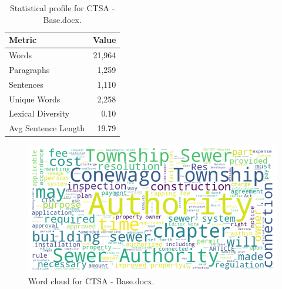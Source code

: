 \begin{table}[!ht]
\centering
\begin{tabular}{lr}
\toprule
\textbf{Metric} & \textbf{Value} \\
\midrule
Words & 21,964 \\
Paragraphs & 1,259 \\
Sentences & 1,110 \\
Unique Words & 2,258 \\
Lexical Diversity & 0.10 \\
Avg Sentence Length & 19.79 \\
\bottomrule
\end{tabular}
\caption{Statistical profile for CTSA - Base.docx.}
\label{tab:ctsa_stats}
\end{table}

\begin{figure}[!ht]
  \centering
  \includegraphics[width=\textwidth]{figures/appendix_fig/GRP002EXP005_eda_wordcloud.png}
  \caption{Word cloud for CTSA - Base.docx.}
  \label{fig:ctsa_wordcloud}
\end{figure}

